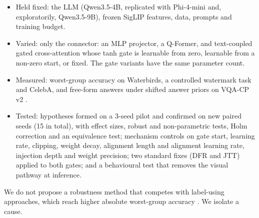 \begin{itemize}
\item
  Held fixed: the LLM (Qwen3.5-4B, replicated with Phi-4-mini and, exploratorily, Qwen3.5-9B), frozen SigLIP features, data, prompts and
  training budget.
\item
  Varied: only the connector: an MLP projector, a Q-Former, and text-coupled gated cross-attention whose tanh
  gate is learnable from zero, learnable from a non-zero start, or fixed. The gate variants have the same parameter count.
\item
  Measured: worst-group accuracy on Waterbirds, a controlled watermark task and CelebA, and free-form answers
  under shifted answer priors on VQA-CP v2 \citep{agrawal2018vqacp}.
\item
  Tested: hypotheses formed on a 3-seed pilot and confirmed on new paired seeds (15 in total), with effect
  sizes, robust and non-parametric tests, Holm correction and an equivalence test; mechanism controls on gate start,
  learning rate, clipping, weight decay, alignment length and alignment learning rate, injection depth and weight precision;
  two standard fixes (DFR and JTT) applied to both gates; and a behavioural
  test that removes the visual pathway at inference.
\end{itemize}

We do not propose a robustness method that competes with label-using approaches, which reach higher absolute
worst-group accuracy \citep{park2026scer}. We isolate a cause.

